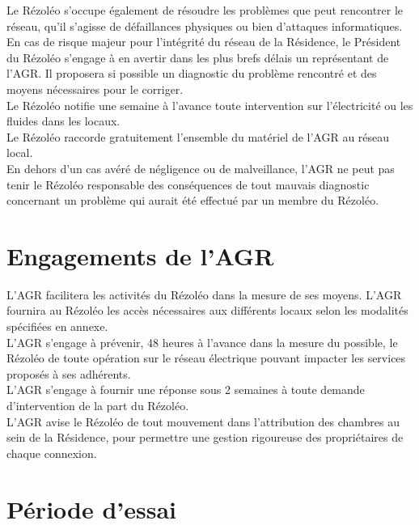 \documentclass[12pt]{constitution}
\begin{document}
    Le Rézoléo s'occupe également de résoudre les problèmes que peut rencontrer le réseau, qu'il s'agisse de défaillances physiques ou bien d'attaques informatiques.\\

    En cas de risque majeur pour l'intégrité du réseau de la Résidence, le Président du Rézoléo s'engage à en avertir dans les plus brefs délais un représentant de l'AGR. Il proposera si possible un diagnostic du problème rencontré et des moyens nécessaires pour le corriger.\\


    Le Rézoléo notifie une semaine à l'avance toute intervention sur l'électricité ou les fluides dans les locaux.\\


    Le Rézoléo raccorde gratuitement l'ensemble du matériel de l'AGR au réseau local.\\


    En dehors d'un cas avéré de négligence ou de malveillance, l'AGR ne peut pas tenir le Rézoléo responsable des conséquences de tout mauvais diagnostic concernant un problème qui aurait été effectué par un membre du Rézoléo.


\section{Engagements de l'AGR}

     L'AGR facilitera les activités du Rézoléo dans la mesure de ses moyens. L'AGR fournira au Rézoléo les accès nécessaires aux différents locaux selon les modalités spécifiées en annexe.\\


    L'AGR s'engage à prévenir, 48 heures à l'avance dans la mesure du possible, le Rézoléo de toute opération sur le réseau électrique pouvant impacter les services proposés à ses adhérents.\\


    L'AGR s'engage à fournir une réponse sous 2 semaines à toute demande d'intervention de la part du Rézoléo.\\


    L'AGR avise le Rézoléo de tout mouvement dans l'attribution des chambres au sein de la Résidence, pour permettre une gestion rigoureuse des propriétaires de chaque connexion.\\


\section{Période d'essai}
\end{document}

